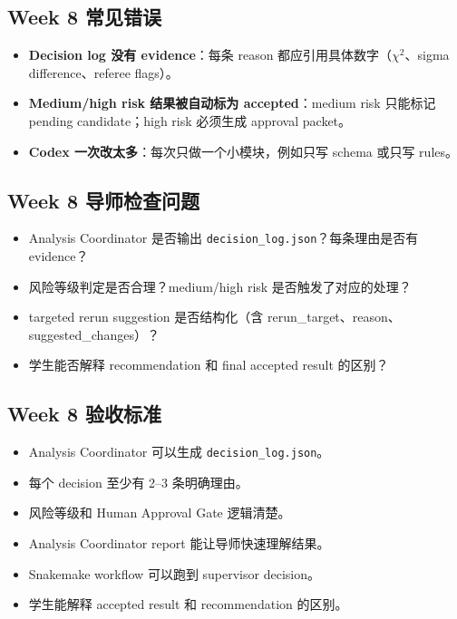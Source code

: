 \documentclass[11pt,a4paper,fontset=none]{ctexart}
\begin{document}
\subsection{Week 8 常见错误}
\begin{itemize}[leftmargin=2em]
  \item \textbf{Decision log 没有 evidence}：每条 reason 都应引用具体数字（$\chi^2$、sigma difference、referee flags）。
  \item \textbf{Medium/high risk 结果被自动标为 accepted}：medium risk 只能标记 pending candidate；high risk 必须生成 approval packet。
  \item \textbf{Codex 一次改太多}：每次只做一个小模块，例如只写 schema 或只写 rules。
\end{itemize}

\subsection{Week 8 导师检查问题}
\begin{itemize}[leftmargin=2em]
  \item Analysis Coordinator 是否输出 \texttt{decision\_log.json}？每条理由是否有 evidence？
  \item 风险等级判定是否合理？medium/high risk 是否触发了对应的处理？
  \item targeted rerun suggestion 是否结构化（含 rerun\_target、reason、suggested\_changes）？
  \item 学生能否解释 recommendation 和 final accepted result 的区别？
\end{itemize}

\subsection{Week 8 验收标准}

\begin{itemize}[leftmargin=2em]
  \item Analysis Coordinator 可以生成 \texttt{decision\_log.json}。
  \item 每个 decision 至少有 2--3 条明确理由。
  \item 风险等级和 Human Approval Gate 逻辑清楚。
  \item Analysis Coordinator report 能让导师快速理解结果。
  \item Snakemake workflow 可以跑到 supervisor decision。
  \item 学生能解释 accepted result 和 recommendation 的区别。
\end{itemize}
\end{document}
